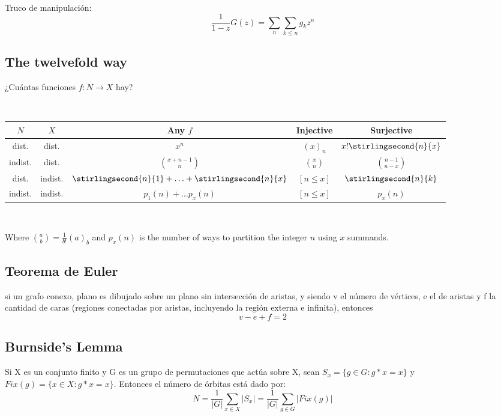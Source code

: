       \ 

      Truco de manipulación:
      \begin{equation*}
        \frac{1}{1-z}G(z) = \sum_{n}\sum_{k\leq n}g_kz^n
      \end{equation*}

    \subsection{The twelvefold way} ¿Cuántas funciones $f \colon N \rightarrow X$ hay?

      \ 

      \begin{tabular}{|c|c|c|c|c|}
        \hline
        $N$ & $X$ & Any $f$ & Injective & Surjective \\ \hline
        dist. & dist. & $x^n$ & $(x)_n$ & $x! \stirlingsecond{n}{x}$ \\ \hline
        indist. & dist. & $\binom{x+n-1}{n}$ & $\binom{x}{n}$ & $\binom{n-1}{n-x}$ \\ \hline
        dist. & indist. & $\stirlingsecond{n}{1} + \ldots + \stirlingsecond{n}{x}$ & $[n \leq x]$ & $\stirlingsecond{n}{k}$ \\ \hline
        indist. & indist. & $p_1(n) + \ldots p_x(n)$ & $[n \leq x]$ & $p_x(n)$ \\ \hline
      \end{tabular}

      \ 

      Where $\binom{a}{b} = \frac{1}{b!}(a)_b $ and $p_x(n)$ is the number of ways to partition the integer $n$ using $x$ summands.
    
    \subsection{Teorema de Euler} si un grafo conexo, plano es dibujado sobre un plano sin intersección de aristas,
      y siendo v el número de vértices, e el de aristas y f la cantidad de caras (regiones conectadas por aristas,
      incluyendo la región externa e infinita), entonces
	\begin{equation*}
	  v-e+f = 2
	\end{equation*}
   
    \subsection{Burnside's Lemma} Si X es un conjunto finito y G es un grupo de permutaciones que actúa sobre X, sean
      $S_x = \{g \in G:g*x=x\}$ y $Fix(g) = \{x \in X:g*x=x\}$. Entonces el número de órbitas está dado por:
	\begin{equation*}
	  N = \frac{1}{|G|}\sum_{x \in X}|S_x| = \frac{1}{|G|}\sum_{g \in G}|Fix(g)|
	\end{equation*}

